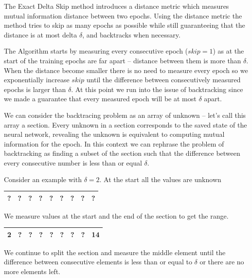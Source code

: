 \documentclass[dissertation.tex]{subfiles}
\begin{document}
  The Exact Delta Skip method introduces a distance metric which measures
  mutual information distance between two epochs. Using the distance metric the
  method tries to skip as many epochs as possible while still guaranteeing that
  the distance is at most delta $\delta$, and backtracks when necessary.

  The Algorithm starts by measuring every consecutive epoch ($skip = 1$) as at
  the start of the training epochs are far apart -- distance between them is
  more than $\delta$. When the distance become smaller there is no need to
  measure every epoch so we exponentially increase $skip$ until the difference
  between consecutively measured epochs is larger than $\delta$. At this point
  we run into the issue of backtracking since we made a guarantee that every
  measured epoch will be at most $\delta$ apart.

  We can consider the backtracing problem as an array of unknown -- let's call
  this array a section. Every unknown in a section corresponds to the saved
  state of the neural network, revealing the unknown is equivalent to computing
  mutual information for the epoch. In this context we can rephrase the problem
  of backtracking as finding a subset of the section such that the difference
  between every consecutive number is less than or equal $\delta$.

  Consider an example with $\delta = 2$.
  At the start all the values are unknown 

  \begin{table}[H]
    \centering
      \begin{tabular}{|c|c|c|c|c|c|c|c|c|}
      \hline			
        ?&?&?&?&?&?&?&?&? \\
      \hline  
    \end{tabular}
  \end{table}

  We measure values at the start and the end of the section to get the range.

  \begin{table}[H]
    \centering
      \begin{tabular}{|c|c|c|c|c|c|c|c|c|}
      \hline			
        \bf{2}&?&?&?&?&?&?&?&\bf{14}\\
      \hline  
    \end{tabular}
  \end{table}

  We continue to split the section and measure the middle element until the
  difference between consecutive elements is less than or equal to $\delta$ or
  there are no more elements left.
\end{document}
